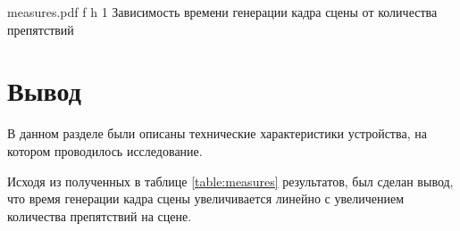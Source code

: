 	{measures.pdf}
	{f}
	{h}
	{1\textwidth}
	{Зависимость времени генерации кадра сцены от количества препятствий}
	
\clearpage
	
\section{Вывод}

В данном разделе были описаны технические характеристики устройства, на котором проводилось исследование.

Исходя из полученных в таблице \ref{table:measures} результатов, был сделан вывод, что время генерации кадра сцены увеличивается линейно с увеличением количества препятствий на сцене.